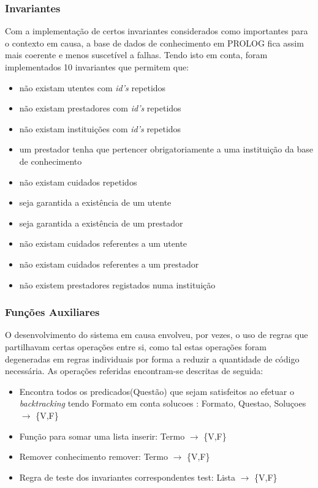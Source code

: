 \documentclass{article}
\begin{document}
\subsubsection{Invariantes}

Com a implementação de certos invariantes considerados como importantes para o contexto em causa, a base de dados de conhecimento em PROLOG fica assim mais coerente e menos suscetível a falhas.
Tendo isto em conta, foram implementados 10 invariantes que permitem que:
\begin{itemize}
	\item não existam utentes com \textit{id's} repetidos
    \item não existam prestadores com \textit{id's} repetidos
    \item não existam instituições com \textit{id's} repetidos
    \item um prestador tenha que pertencer obrigatoriamente a uma instituição da base de conhecimento
    \item não existam cuidados repetidos
    \item seja garantida a existência de um utente
    \item seja garantida a existência de um prestador
    \item não existam cuidados referentes a um utente
    \item não existam cuidados referentes a um prestador
    \item não existem prestadores registados numa instituição
\end{itemize}


\subsubsection{Funções Auxiliares}
O desenvolvimento do sistema em causa envolveu, por vezes, o uso de regras que partilhavam certas operações entre si, como tal estas operações foram degeneradas em regras individuais por forma a reduzir a quantidade de código necessária. As operações referidas encontram-se descritas de seguida:
\begin{itemize}
	\item Encontra todos os predicados(Questão) que sejam satisfeitos ao efetuar o \textit{backtracking} tendo Formato em conta
\newline
solucoes : Formato, Questao, Soluçoes $\to$ \{V,F\}
	\item Função para somar uma lista      
\newline
inserir: Termo $\to$ \{V,F\}
	\item Remover conhecimento
\newline
remover: Termo $\to$ \{V,F\}
	\item Regra de teste dos invariantes correspondentes
\newline
test: Lista $\to$ \{V,F\}
\end{itemize}
\end{document}
